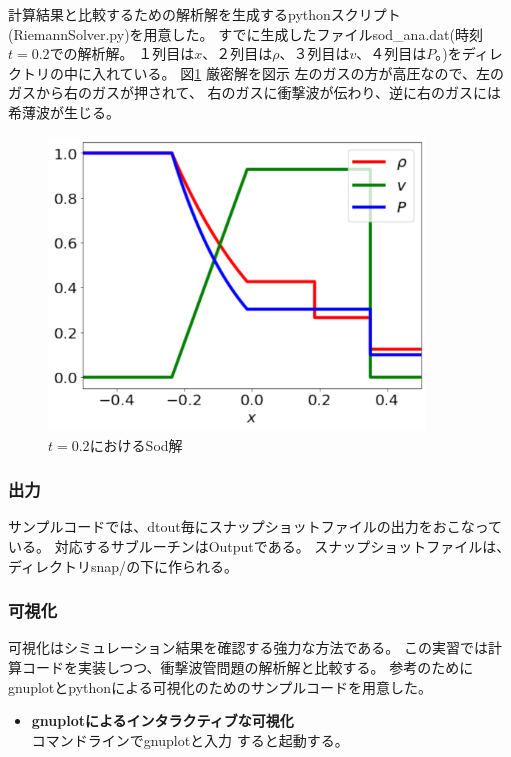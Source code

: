{計算結果と比較するための解析解を生成する{\ttfamily python}スクリプト({\ttfamily RiemannSolver.py})を用意した。
すでに生成したファイル{\ttfamily sod\_ana.dat}(時刻$t=0.2$での解析解。
１列目は$x$、２列目は$\rho$、３列目は$v$、４列目は$P$。)をディレクトリの中に入れている。
図\ref{fig:sodana}
厳密解を図示
左のガスの方が高圧なので、左のガスから右のガスが押されて、
右のガスに衝撃波が伝わり、逆に右のガスには希薄波が生じる。

\begin{figure}[htpb]
    \centering
    \includegraphics[width=10cm]{sod.pdf}
    \caption{$t=0.2$におけるSod解}
    \label{fig:sodana}
\end{figure}





\subsubsection{出力}

サンプルコードでは、{\ttfamily dtout}毎にスナップショットファイルの出力をおこなっている。
対応するサブルーチンは{\ttfamily Output}である。
スナップショットファイルは、ディレクトリ{\ttfamily snap/}の下に作られる。

\subsubsection{可視化}

可視化はシミュレーション結果を確認する強力な方法である。
この実習では計算コードを実装しつつ、衝撃波管問題の解析解と比較する。
参考のために{\ttfamily gnuplot}と{\ttfamily python}による可視化のためのサンプルコードを用意した。

\begin{itemize}
    \item  {\bf {\ttfamily gnuplot}によるインタラクティブな可視化} \\
    コマンドラインで{\ttfamily gnuplot}と入力
    すると起動する。


\end{itemize}}
